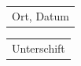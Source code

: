 \documentclass{scrreprt}
\begin{document}
\vspace{1.5cm}
 
\begin{table}[ht]
    \begin{minipage}{0.5\textwidth}
        \begin{tabular}{p{5cm}}
            \hline
            Ort, Datum
        \end{tabular}
    \end{minipage}
    \hfill
    \begin{minipage}{0.5\textwidth}
        \begin{tabular}{p{5cm}}
            \hline
            Unterschift
        \end{tabular}
    \end{minipage}
\end{table}
\end{document}
